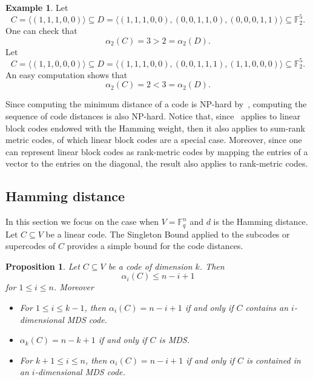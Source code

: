 \documentclass[12pt]{amsart}
\numberwithin{equation}{section}
\newtheorem{proposition}[theorem]{Proposition}
\theoremstyle{definition}
\newtheorem{example}[theorem]{Example}
\newcommand{\FF}{\mathbb{F}}
\begin{document}
\begin{example}\label{25.03.04}
Let
\[C = \langle(1,1,1,0,0)\rangle\subseteq D=\langle(1,1,1,0,0),(0,0,1,1,0),(0,0,0,1,1)\rangle \subseteq\FF_2^5.\]
One can check that $$\alpha_2(C) = 3 > 2 = \alpha_2(D).$$
Let \[C = \langle(1,1,0,0,0)\rangle \subseteq D=\langle(1,1,1,0,0),(0,0,1,1,1),(1,1,0,0,0)\rangle \subseteq\FF_2^5.\]
An easy computation shows that $$\alpha_2(C) = 2 < 3 = \alpha_2(D).$$
\end{example}

Since computing the minimum distance of a code is NP-hard by~\cite{V97}, computing the sequence of code distances is also NP-hard. Notice that, since~\cite{V97} applies to linear block codes endowed with the Hamming weight, then it also applies to sum-rank metric codes, of which linear block codes are a special case. Moreover, since one can represent linear block codes as rank-metric codes by mapping the entries of a vector to the entries on the diagonal, the result also applies to rank-metric codes.


\subsection{Hamming distance} 

In this section we focus on the case when $V=\FF_q^n$ and $d$ is the Hamming distance. Let $C \subseteq V$ be a linear code. The Singleton Bound applied to the subcodes or supercodes of $C$ provides a simple bound for the code distances.

\begin{proposition}\label{alpha for MDS}
Let $C \subseteq V$ be a code of dimension $k$. Then $$\alpha_i(C)\leq n-i+1$$ for $1\leq i\leq n$. Moreover
\begin{itemize}
\item For $1\leq i \leq k-1$, then $\alpha_i(C)=n-i+1$ if and only if $C$ contains an $i$-dimensional MDS code.
\item $\alpha_k(C)=n-k+1$ if and only if $C$ is MDS.
\item For $k+1 \leq i \leq n$, then $\alpha_i(C)=n-i+1$ if and only if $C$ is contained in an $i$-dimensional MDS code.
\end{itemize}
\end{proposition}
\end{document}
